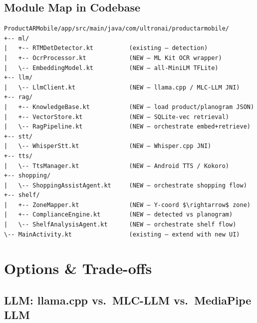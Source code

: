 \documentclass[11pt,a4paper]{article}
\begin{document}
\subsection{Module Map in Codebase}

\begin{verbatim}
ProductARMobile/app/src/main/java/com/ultronai/productarmobile/
+-- ml/
|   +-- RTMDetDetector.kt          (existing — detection)
|   +-- OcrProcessor.kt            (NEW — ML Kit OCR wrapper)
|   \-- EmbeddingModel.kt          (NEW — all-MiniLM TFLite)
+-- llm/
|   \-- LlmClient.kt               (NEW — llama.cpp / MLC-LLM JNI)
+-- rag/
|   +-- KnowledgeBase.kt           (NEW — load product/planogram JSON)
|   +-- VectorStore.kt             (NEW — SQLite-vec retrieval)
|   \-- RagPipeline.kt             (NEW — orchestrate embed+retrieve)
+-- stt/
|   \-- WhisperStt.kt              (NEW — Whisper.cpp JNI)
+-- tts/
|   \-- TtsManager.kt              (NEW — Android TTS / Kokoro)
+-- shopping/
|   \-- ShoppingAssistAgent.kt     (NEW — orchestrate shopping flow)
+-- shelf/
|   +-- ZoneMapper.kt              (NEW — Y-coord $\rightarrow$ zone)
|   +-- ComplianceEngine.kt        (NEW — detected vs planogram)
|   \-- ShelfAnalysisAgent.kt      (NEW — orchestrate shelf flow)
\-- MainActivity.kt                (existing — extend with new UI)
\end{verbatim}

\section{Options \& Trade-offs}

\subsection{LLM: llama.cpp vs.\ MLC-LLM vs.\ MediaPipe LLM}
\end{document}
